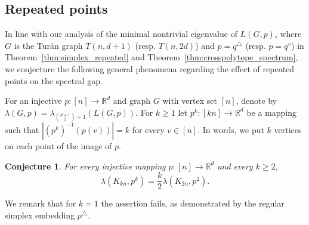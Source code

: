 \documentclass[a4paper,11pt]{article}
\theoremstyle{plain}
\newtheorem{conjecture}[theorem]{\bf Conjecture}
\theoremstyle{definition}
\newcommand{\Rea}{{\mathbb R}}
\begin{document}
\subsection{Repeated points}
In line with our analysis of the minimal nontrivial eigenvalue of $L(G,p)$, where $G$ is the Tur{\'a}n graph $T(n,d+1)$ (resp. $T(n,2d)$) and $p=q^{\triangle}$ (resp. $p=q^{\diamond}$) in Theorem~\ref{thm:simplex_repeated} and Theorem~\ref{thm:crosspolytope_spectrum}, we conjecture the following general phenomena regarding the effect of repeated points on the spectral gap.

For an injective $p: [n] \to \Rea^d$ and graph $G$ with vertex set $[n]$, denote by $\lambda(G,p)=\lambda_{\binom{d+1}{2}+1}(L(G,p))$.  
For $k\ge 1$ let $p^{k}: [kn] \to \Rea^d $ be a mapping such that $|(p^{k})^{-1}(p(v))|=k$ for every $v\in [n]$. In words, we put $k$ vertices on each point of the image of $p$.

\begin{conjecture}
For every injective mapping $p: [n] \to \Rea^d$ and every $k\ge 2$, 
\[\lambda(K_{kn},p^{k})= \frac{k}{2}\lambda(K_{2n},p^{2}).
\]
\end{conjecture}
We remark that for $k=1$ the assertion fails, as demonstrated by the regular simplex embedding $p^{\triangle}$.



\end{document}
